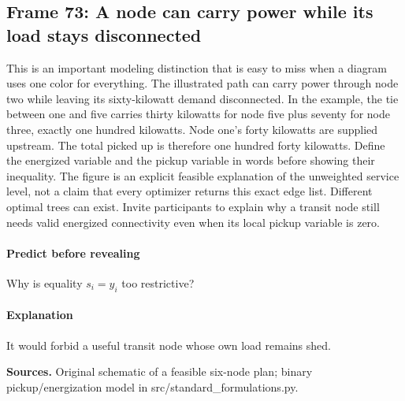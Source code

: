 \documentclass[11pt]{article}
\begin{document}
\subsection*{Frame 73: A node can carry power while its load stays disconnected}
This is an important modeling distinction that is easy to miss when a diagram uses one color for everything. The illustrated path can carry power through node two while leaving its sixty-kilowatt demand disconnected. In the example, the tie between one and five carries thirty kilowatts for node five plus seventy for node three, exactly one hundred kilowatts. Node one's forty kilowatts are supplied upstream. The total picked up is therefore one hundred forty kilowatts. Define the energized variable and the pickup variable in words before showing their inequality. The figure is an explicit feasible explanation of the unweighted service level, not a claim that every optimizer returns this exact edge list. Different optimal trees can exist. Invite participants to explain why a transit node still needs valid energized connectivity even when its local pickup variable is zero.\par
\paragraph{Predict before revealing}Why is equality $s_i=y_i$ too restrictive?
\paragraph{Explanation}It would forbid a useful transit node whose own load remains shed.
\par\nopagebreak\begin{minipage}{\linewidth}{\footnotesize\color{slate}\textbf{Sources.} Original schematic of a feasible six-node plan; binary pickup/energization model in src/standard\_formulations.py.\par}\end{minipage}\par\medskip
\end{document}
